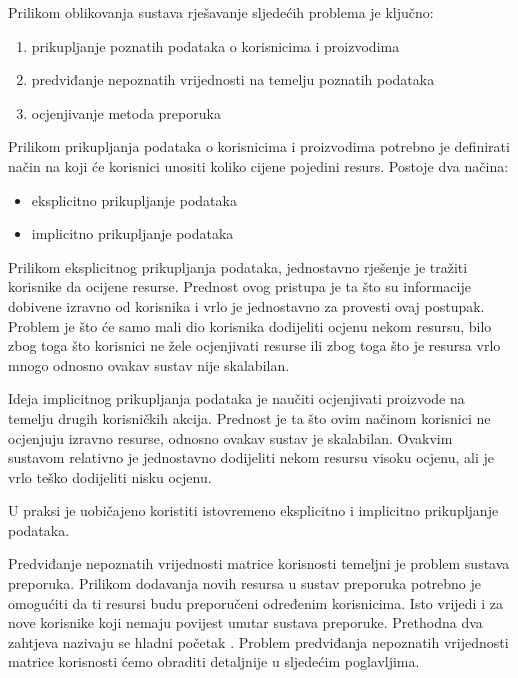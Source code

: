 \documentclass[times, utf8, seminar]{fer}
\begin{document}
Prilikom oblikovanja sustava rješavanje sljedećih problema je ključno:
\begin{enumerate}
	\item prikupljanje poznatih podataka o korisnicima i proizvodima
	\item predviđanje nepoznatih vrijednosti na temelju poznatih podataka
	\item ocjenjivanje metoda preporuka
\end{enumerate}

Prilikom prikupljanja podataka o korisnicima i proizvodima potrebno je definirati način na koji će korisnici unositi koliko cijene pojedini resurs. Postoje dva načina:
\begin{itemize}
	\item eksplicitno prikupljanje podataka
	\item implicitno prikupljanje podataka
\end{itemize}

Prilikom eksplicitnog prikupljanja podataka, jednostavno rješenje je tražiti korisnike da ocijene resurse. Prednost ovog pristupa je ta što su informacije dobivene izravno od korisnika i vrlo je jednostavno za provesti ovaj postupak. Problem je što će samo mali dio korisnika dodijeliti ocjenu nekom resursu, bilo zbog toga što korisnici ne žele ocjenjivati resurse ili zbog toga što je resursa vrlo mnogo odnosno ovakav sustav nije skalabilan.

Ideja implicitnog prikupljanja podataka je naučiti ocjenjivati proizvode na temelju drugih korisničkih akcija. Prednost je ta što ovim načinom korisnici ne ocjenjuju izravno resurse, odnosno ovakav sustav je skalabilan. Ovakvim sustavom relativno je jednostavno dodijeliti nekom resursu visoku ocjenu, ali je vrlo teško dodijeliti nisku ocjenu.

U praksi je uobičajeno koristiti istovremeno eksplicitno i implicitno prikupljanje podataka.

Predviđanje nepoznatih vrijednosti matrice korisnosti temeljni je problem sustava preporuka. Prilikom dodavanja novih resursa u sustav preporuka potrebno je omogućiti da ti resursi budu preporučeni određenim korisnicima. Isto vrijedi i za nove korisnike koji nemaju povijest unutar sustava preporuke. Prethodna dva zahtjeva nazivaju se hladni početak . Problem predviđanja nepoznatih vrijednosti matrice korisnosti ćemo obraditi detaljnije u sljedećim poglavljima.
\end{document}
